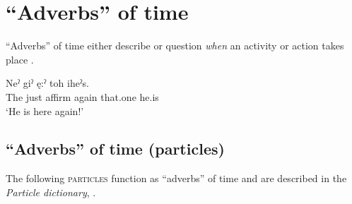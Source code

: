 \section{“Adverbs” of time} \label{ch:’Adverbs’ of time}
“Adverbs” of time either describe or question \emph{when} an activity or action takes place . 

\ea\label{ex:advtimeex}
\gll Neˀ giˀ ę:ˀ  toh iheˀs. \\
The just affirm again that.one he.is\\
\glt ‘He is here again!’
\z


\subsection{“Adverbs” of time (particles)}
The following \textsc{particles} function as “adverbs” of time and are described in the \textit{Particle dictionary}, .

